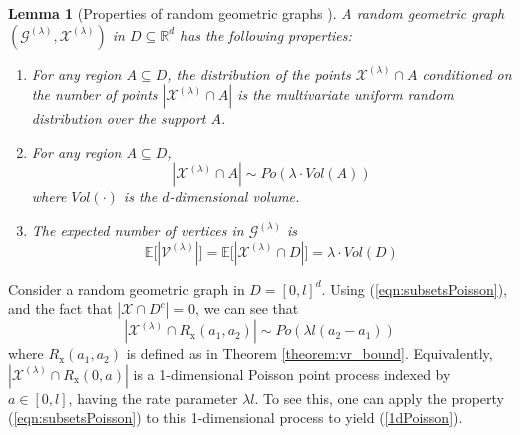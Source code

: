 \documentclass[twocolumn]{article}
\theoremstyle{plain}
\newtheorem{lemma}{Lemma}
\theoremstyle{definition}
\theoremstyle{definition}
\theoremstyle{remark}
\begin{document}
\begin{lemma}[Properties of random geometric graphs \cite{daley2008poissonTheory}]
A random geometric graph $(\mathcal G^{(\lambda)}, \mathcal X^{(\lambda)})$ in $D\subseteq \mathbb R^d$ has the following properties: 
\begin{enumerate}
\item For any region $ A \subseteq D$, the distribution of the points $\mathcal X^{(\lambda)}\cap A$ conditioned on the number of points $|\mathcal X^{(\lambda)}\cap A|$ is the multivariate uniform random distribution over the support $A$.
\item For any region $ A \subseteq D$,
\begin{equation}
    |\mathcal X^{(\lambda)} \cap A|\sim \textit{Po}\left(\lambda\cdot\textit{Vol}(A)\right)
    \label{eqn:subsetsPoisson}
\end{equation}
where $\textit{Vol}(\cdot)$ is the $d$-dimensional volume. 
\item The expected number of vertices in $\mathcal G^{(\lambda)}$ is
\begin{equation}
\mathbb E\big[|\mathcal V^{(\lambda)}|\big]  =  \mathbb E\big[|\mathcal X^{(\lambda)} \cap D|\big] = \lambda\cdot\textit{Vol}(D)
\label{eqn:totalPoisson}
\end{equation}
\end{enumerate}
\label{lem:poisson}
\end{lemma}
\noindent
Consider a random geometric graph in $D=[0,l]^d$. 
Using (\ref{eqn:subsetsPoisson}), and the fact that $|\mathcal X \cap D^c|=0$, we can see that
\begin{equation}
    | \mathcal{X}^{(\lambda)}\cap \textit{R}_\textrm{x}(a_1,a_2) |
    \sim \textit{Po}(\lambda l(a_2-a_1))
    \label{1dPoisson}
\end{equation}
where $R_\textrm{x}(a_1,a_2)$ is defined as in Theorem \ref{theorem:vr_bound}. Equivalently, $| \mathcal{X}^{(\lambda)}\cap \textit{R}_\textrm{x}(0,a) |$ is a 1-dimensional Poisson point process indexed by $a\in [0,l]$, having the rate parameter $\lambda l$. To see this, one can apply the property (\ref{eqn:subsetsPoisson}) to this 1-dimensional process to yield (\ref{1dPoisson}).
\end{document}
